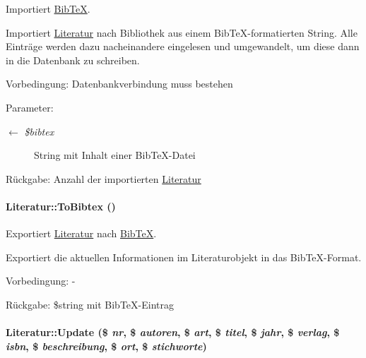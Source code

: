 Importiert \hyperlink{classBibTeX}{Bib\-Te\-X}. 

Importiert \hyperlink{classLiteratur}{Literatur} nach Bibliothek aus einem Bib\-Te\-X-formatierten String. Alle Einträge werden dazu nacheinandere eingelesen und umgewandelt, um diese dann in die Datenbank zu schreiben. \begin{Desc}
\item[Vorbedingung:]Datenbankverbindung muss bestehen \end{Desc}
\begin{Desc}
\item[Parameter:]
\begin{description}
\item[\mbox{$\leftarrow$} {\em \$bibtex}]String mit Inhalt einer Bib\-Te\-X-Datei \end{description}
\end{Desc}
\begin{Desc}
\item[R\"{u}ckgabe:]Anzahl der importierten \hyperlink{classLiteratur}{Literatur}\end{Desc}
\hypertarget{classLiteratur_11f6d1a4409c41638ff6693f65699ff3}{
\paragraph[ToBibtex]{\setlength{\rightskip}{0pt plus 5cm}Literatur::To\-Bibtex ()}\hfill}
\label{classLiteratur_11f6d1a4409c41638ff6693f65699ff3}


Exportiert \hyperlink{classLiteratur}{Literatur} nach \hyperlink{classBibTeX}{Bib\-Te\-X}. 

Exportiert die aktuellen Informationen im Literaturobjekt in das Bib\-Te\-X-Format. \begin{Desc}
\item[Vorbedingung:]- \end{Desc}
\begin{Desc}
\item[R\"{u}ckgabe:]\$string mit Bib\-Te\-X-Eintrag \end{Desc}
\hypertarget{classLiteratur_b613c28476ea28058f8fc2bccb57c923}{
\paragraph[Update]{\setlength{\rightskip}{0pt plus 5cm}Literatur::Update (\$ {\em nr}, \$ {\em autoren}, \$ {\em art}, \$ {\em titel}, \$ {\em jahr}, \$ {\em verlag}, \$ {\em isbn}, \$ {\em beschreibung}, \$ {\em ort}, \$ {\em stichworte})}\hfill}
\label{classLiteratur_b613c28476ea28058f8fc2bccb57c923}


